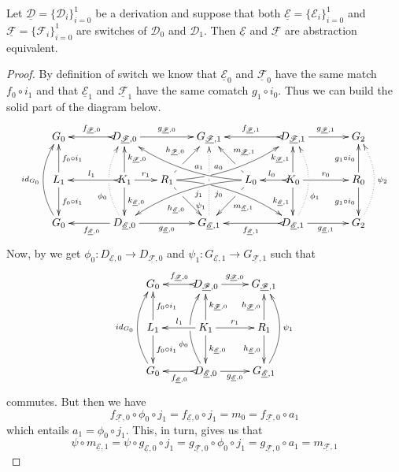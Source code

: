\documentclass[a4paper,UKenglish,cleveref,pdftex, thm-restate,numberwithinsect]{lipics}
\newcommand{\id}[1]{\mathsf{id}_{#1}}
\newcommand{\dder}[1]{\mathscr{#1}}
\newcommand{\der}[1]{\underline{\dder{#1}}}
\begin{document}
\begin{lemma}\label{thm:switch_uni} Let $\der{D}=\{\dder{D}_{i}\}_{i=0}^1$ be a derivation and suppose that both $\der{E}=\{\dder{E}_i\}_{i=0}^1$  and $\der{F}=\{\dder{F}_i\}_{i=0}^1$ are switches of $\dder{D}_0$ and $\dder{D}_1$. Then $\der{E}$ and $\der{F}$ are abstraction equivalent.
\end{lemma}
\begin{proof}
	By definition of switch we know that $\der{E}_0$ and $\der{F}_0$ have the same match $f_0\circ i_1$ and that $\der{E}_1$ and $\der{F}_1$ have the same comatch $g_1\circ i_0$. Thus we can build the solid part of the diagram below.
	\[\xymatrix@C=15pt{G_{0} && \ar@{>->}[ll]_{f_{\der{F},0}} D_{\der{F},0} \ar[rr]^{g_{\der{F},0}}&& G_{\der{F},1} && \ar@{>->}[ll]_{f_{\der{F},1}} D_{\der{F},1} \ar[rr]^{g_{\der{F},1}}&& G_{2}\\L_1 \ar[d]^{f_0\circ i_1} \ar[u]_{f_0\circ i_1}&& K_{1} \ar[d]^{k_{\der{E},0}} \ar[u]_{k_{\der{F},0}}\ar@{>->}[ll]_{l_1} \ar[r]^{r_1} & R_{1} \ar@/^.35cm/[drrr]|(.3)\hole_(.4){j_0} \ar[dr]|(.3)\hole_{h_{\der{E},0}} \ar@/_.35cm/[urrr]|(.3)\hole^(.4){a_0} \ar[ur]|(.3)\hole^{h_{\der{F},0}}& &L_{0} \ar@/_.35cm/[dlll]^(.4){j_1} \ar[dl]|(.3)\hole^{m_{\der{E},1}} \ar@/^.35cm/[ulll]_(.4){a_1} \ar[ul]|(.3)\hole_{m_{\der{F},1}}& K_{0} \ar[d]_{k_{\der{E},1}} \ar[u]^{k_{\der{F},1}}\ar@{>->}[l]_{l_{0}} \ar[rr]^{r_0} && R_{0} \ar[d]_{g_1\circ i_0} \ar[u]^{g_1\circ i_0}\\ \ar@/^.5cm/[uu]^{\id{G_0}} G_{0} && \ar[ll]^{f_{\der{E},0}} D_{\der{E},0} \ar@{.>}@/^.5cm/[uu]^(.33){\phi_{0}}|\hole \ar[rr]_{g_{\der{E},0}}&& G_{\der{E},1} \ar@{.>}[uu]^(.2){\psi_1}|(.45)\hole |(.55)\hole&& \ar@{>->}[ll]^{f_{\der{E},1}} D_{\der{E},1} \ar@{.>}@/_.5cm/[uu]_(.33){\phi_{1}}|\hole\ar[rr]_{g_{\der{E},1}}&& G_{2}\ar@{.>}@/_.5cm/[uu]_{\psi_2}}\]
	Now, by  we get $\phi_0\colon D_{\der{E},0}\to D_{\der{F},0}$ and $\psi_1 \colon G_{\der{E},1}\to G_{\der{F},1}$ such that 
	\[\xymatrix{G_{0} & \ar@{>->}[l]_{f_{\der{F},0}} D_{\der{F},0} \ar[r]^{g_{\der{F},0}}& G_{\der{F},1} \\L_1 \ar[d]^{f_0\circ i_1} \ar[u]_{f_0\circ i_1}& K_{1} \ar[d]^{k_{\der{E},0}} \ar[u]_{k_{\der{F},0}}\ar[l]_{l_1} \ar[r]^{r_1} & R_{1}  \ar[d]_{h_{\der{E},0}}  \ar[u]^{h_{\der{F},0}}\\ \ar@/^.5cm/[uu]^{\id{G_0}} G_{0} & \ar@{>->}[l]^{f_{\der{E},0}} D_{\der{E},0} \ar@/^.5cm/[uu]^(.33){\phi_{0}}|\hole \ar[r]_{g_{\der{E},0}}& G_{\der{E},1} \ar@/_.5cm/[uu]_{\psi_1}}\]
	commutes. But then we have
	\[
	f_{\der{F},0}\circ \phi_0\circ j_1=f_{\der{E},0} \circ j_1=m_0=f_{\der{F},0}\circ a_1\]
	which entails $a_1= \phi_0\circ j_1$. This, in turn, gives us that
	\[\psi\circ m_{\der{E},1}=\psi \circ g_{\der{E},0}\circ j_1=g_{\der{F},0}\circ \phi_0\circ j_1=g_{\der{F},0}\circ a_1=m_{\der{F},1}\]
	

\end{proof}
\end{document}
